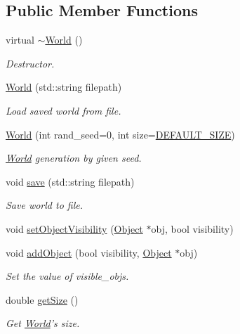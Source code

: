 \subsection*{Public Member Functions}
\begin{DoxyCompactItemize}
\item 
virtual \hyperlink{classWorld_a8c73fba541a5817fff65147ba47cd827}{$\sim$\-World} ()
\begin{DoxyCompactList}\small\item\em Destructor. \end{DoxyCompactList}\item 
\hyperlink{classWorld_ac339c606fb3832d11bcf16ad05685f61}{World} (std\-::string filepath)
\begin{DoxyCompactList}\small\item\em Load saved world from file. \end{DoxyCompactList}\item 
\hyperlink{classWorld_aa2eb821136019047477f955fe3d8e7b0}{World} (int rand\-\_\-seed=0, int size=\hyperlink{World_8h_a9771cabfd673a8e350f1f8ce0b8f458f}{D\-E\-F\-A\-U\-L\-T\-\_\-\-S\-I\-Z\-E})
\begin{DoxyCompactList}\small\item\em \hyperlink{classWorld}{World} generation by given seed. \end{DoxyCompactList}\item 
void \hyperlink{classWorld_af56d4516a5cf72c93f3e5bb34cd7d5cd}{save} (std\-::string filepath)
\begin{DoxyCompactList}\small\item\em Save world to file. \end{DoxyCompactList}\item 
void \hyperlink{classWorld_a75e7d1877074f95c25c4696b9932d21f}{set\-Object\-Visibility} (\hyperlink{classObject}{Object} $\ast$obj, bool visibility)
\item 
void \hyperlink{classWorld_a5958579b1313daec5993026df26c7f63}{add\-Object} (bool visibility, \hyperlink{classObject}{Object} $\ast$obj)
\begin{DoxyCompactList}\small\item\em Set the value of visible\-\_\-objs. \end{DoxyCompactList}\item 
double \hyperlink{classWorld_a1c3e886903df2a4fcb8bff59e0dbf115}{get\-Size} ()
\begin{DoxyCompactList}\small\item\em Get \hyperlink{classWorld}{World}'s size. \end{DoxyCompactList}\item 

\end{DoxyCompactItemize}
